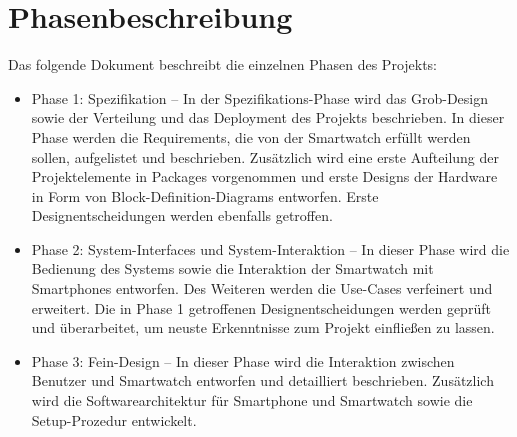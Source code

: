 \section{Phasenbeschreibung}
Das folgende Dokument beschreibt die einzelnen Phasen des Projekts:
\begin{itemize}
  \item Phase 1: Spezifikation -- In der Spezifikations-Phase wird das Grob-Design sowie der Verteilung und das Deployment des Projekts beschrieben. In dieser Phase werden die \glspl{Requirement}, die von der Smartwatch erfüllt werden sollen, aufgelistet und beschrieben. Zusätzlich wird eine erste Aufteilung der Projektelemente in \glspl{Package} vorgenommen und erste Designs der Hardware in Form von Block-Definition-Diagrams entworfen. Erste Designentscheidungen werden ebenfalls getroffen.

  \item Phase 2: System-Interfaces und System-Interaktion -- In dieser Phase wird die Bedienung des Systems sowie die Interaktion der Smartwatch mit Smartphones entworfen. Des Weiteren werden die Use-Cases verfeinert und erweitert. Die in Phase 1 getroffenen Designentscheidungen werden geprüft und überarbeitet, um neuste Erkenntnisse zum Projekt einfließen zu lassen.

  \item Phase 3: Fein-Design -- In dieser Phase wird die Interaktion zwischen Benutzer und Smartwatch entworfen und detailliert beschrieben. Zusätzlich wird die Softwarearchitektur für Smartphone und Smartwatch sowie die Setup-Prozedur entwickelt.
\end{itemize}
